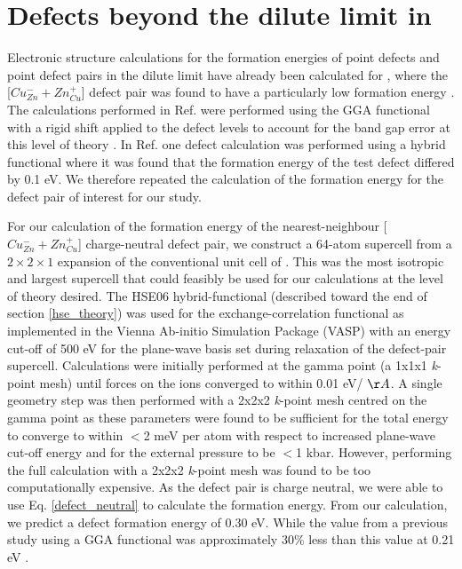 \documentclass[11pt, twoside]{report}
\begin{document}



\section{Defects beyond the dilute limit in {\CZTS}}\label{CZTS_beyond_dilute}
Electronic structure calculations for the formation energies of point defects and point defect pairs in the dilute limit have already been calculated for {\CZTS}, where the [$Cu_{Zn}^- + Zn_{Cu}^+$] defect pair was found to have a particularly low formation energy \cite{defects_Chen}.
The calculations performed in Ref.  were performed using the GGA functional with a rigid shift applied to the defect levels to account for the band gap error at this level of theory \cite{Lany_defects}. In Ref.  one defect calculation was performed using a hybrid functional where it was found that the formation energy of the test defect differed by 0.1 eV. We therefore repeated the calculation of the formation energy for the defect pair of interest for our study.

For our calculation of the formation energy of the nearest-neighbour [$Cu_{Zn}^- + Zn_{Cu}^+$] charge-neutral defect pair, we construct a 64-atom supercell from a $2\times2\times1$ expansion of the conventional unit cell of {\CZTS}. This was the most isotropic and largest supercell that could feasibly be used for our calculations at the level of theory desired.
The HSE06 hybrid-functional \cite{HSE} (described toward the end of section \ref{hse_theory}) was used for the exchange-correlation functional as implemented in the Vienna Ab-initio Simulation Package (VASP) \cite{VASP} with an energy cut-off of 500 eV for the plane-wave basis set during relaxation of the defect-pair supercell. Calculations were initially performed at the gamma point (a 1x1x1 \textit{k}-point mesh) until forces on the ions converged to within 0.01 eV/ $\AA$. 
A single geometry step was then performed with a 2x2x2 \textit{k}-point mesh centred on the gamma point as these parameters were found to be sufficient for the total energy to converge to within $<$2 meV per atom with respect to increased plane-wave cut-off energy and for the external pressure to be $<$1 kbar. However, performing the full calculation with a 2x2x2 \textit{k}-point mesh was found to be too computationally expensive. 
As the defect pair is charge neutral, we were able to use Eq. \ref{defect_neutral} to calculate the formation energy. From our calculation, we predict a defect formation energy of 0.30 eV. While the value from a previous study using a GGA functional was approximately 30\% less than this value at 0.21 eV \cite{defects_Chen}.
\end{document}

